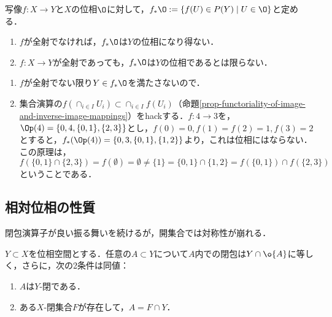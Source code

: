 \documentclass[uplatex,dvipdfmx]{jsreport}
\begin{document}
\begin{proposition}
    写像$f:X\to Y$と$X$の位相$\O$に対して，$f_*\O:=\{f(U)\in P(Y)\mid U\in\O\}$と定める．
    \begin{enumerate}
        \item $f$が全射でなければ，$f_*\O$は$Y$の位相になり得ない．
        \item $f:X\to Y$が全射であっても，$f_*\O$は$Y$の位相であるとは限らない．
    \end{enumerate}
\end{proposition}
\begin{Proof}\mbox{}
    \begin{enumerate}
        \item $f$が全射でない限り$Y\in f_*\O$を満たさないので．
        \item 集合演算の$f(\cap_{i\in I}U_i)\subset \cap_{i\in I}f(U_i)$（命題\ref{prop-functoriality-of-image-and-inverse-image-mappings}）をhackする．$f:4\to 3$を，$\Op(4)=\{0,4,\{0,1\},\{2,3\}\}$とし，$f(0)=0,f(1)=f(2)=1,f(3)=2$とすると，$f_*(\Op(4))=\{0,3,\{0,1\},\{1,2\}\}$より，これは位相にはならない．
        この原理は，$f(\{0,1\}\cap\{2,3\})=f(\emptyset)=\emptyset\ne\{1\}=\{0,1\}\cap\{1,2\}=f(\{0,1\})\cap f(\{2,3\})$ということである．
    \end{enumerate}
\end{Proof}

\subsection{相対位相の性質}

\begin{tcolorbox}[colframe=ForestGreen, colback=ForestGreen!10!white,breakable,colbacktitle=ForestGreen!40!white,coltitle=black,fonttitle=\bfseries\sffamily,
title=]
    閉包演算子が良い振る舞いを続けるが，開集合では対称性が崩れる．
\end{tcolorbox}

\begin{proposition}[閉集合の特徴付け]
    $Y\subset X$を位相空間とする．任意の$A\subset Y$について$A$内での閉包は$Y\cap\o{A}$に等しく，さらに，次の2条件は同値：
    \begin{enumerate}
        \item $A$は$Y$-閉である．
        \item ある$X$-閉集合$F$が存在して，$A=F\cap Y$．
    \end{enumerate}
\end{proposition}
\end{document}
